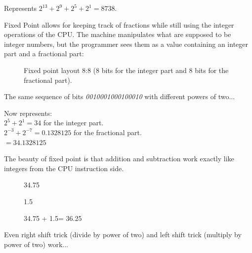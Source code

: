 Represents $ 2^{13} + 2^9 + 2^5 + 2^1 =  8738 $.\\
 \par

Fixed Point allows for keeping track of fractions while still using the integer operations of the CPU. The machine manipulates what are supposed to be integer numbers, but the programmer sees them as a value containing an integer part and a fractional part:\\
\par
\begin{figure}[H]
 \centering
  
 \caption{Fixed point layout 8:8 (8 bits for the integer part and 8 bits for the fractional part).} \label{fig:mips}
\end{figure}
                                
The same sequence of bits \emph{0010001000100010} with different powers of two...
\begin{figure}[H]
 \centering
   
\end{figure} 

Now represents:\\

$ 2^5 + 2^1 = 34 $ for the integer part.\\
$ 2^{-3}+2^{-7} = 0.1328125 $ for the fractional part.\\
$ = 34.1328125$\\

\bigskip

The beauty of fixed point is that addition and subtraction work exactly like integers from the CPU instruction side.\\




\par
\begin{figure}[H]
 \centering
   

   \caption{34.75} 
\end{figure} 

\begin{figure}[H]
 \centering
   
  \caption{1.5} 
\end{figure} 

\begin{figure}[H]
 \centering
   
  {\caption{34.75 + 1.5= 36.25}}
\end{figure} 
\par
 Even right shift trick (divide by power of two) and left shift trick (multiply by power of two) work...\\
 
